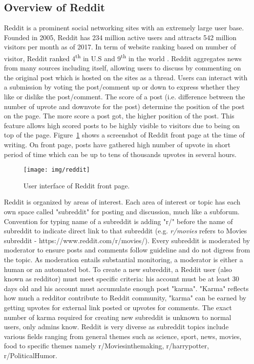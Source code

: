 \subsection{Overview of Reddit}
Reddit is a prominent social networking sites with an extremely large user base. Founded in 2005, Reddit has 234 million active users and attracts 542 million visitors per month as of 2017. In term of website ranking based on number of visitor, Reddit ranked 4\textsuperscript{th} in U.S and 9\textsuperscript{th} in the world \cite{Alexa2017}. Reddit aggregates news from many sources including itself, allowing users to discuss by commenting on the original post which is hosted on the sites as a thread. Users can interact with a submission by voting the post/comment up or down to express whether they like or dislike the post/comment. The score of a post (i.e. difference between the number of upvote and downvote for the post) determine the position of the post on the page. The more score a post got, the higher position of the post. This feature allows high scored posts to be highly visible to visitors due to being on top of the page. Figure~\ref{fig:reddit} shows a screenshot of Reddit front page at the time of writing. On front page, posts have gathered high number of upvote in short period of time which can be up to tens of thousands upvotes in several hours.
\begin{figure}[h!]
\centering
\texttt{[image: img/reddit]}
\caption{User interface of Reddit front page.} 
\label{fig:reddit}
\end{figure} 
Reddit is organized by areas of interest. Each area of interest or topic has each own space called "subreddit" for posting and discussion, much like a subforum. Convention for typing name of a subreddit is adding "r/" before the name of subreddit to indicate direct link to that subreddit (e.g. \textit{r/movies} refers to Movies subreddit - https://www.reddit.com/r/movies/). Every subreddit is moderated by moderator to ensure posts and comments follow guideline and do not digress from the topic. As moderation entails substantial monitoring, a moderator is either a human or an automated bot. To create a new subreddit, a Reddit user (also known as redditor) must meet specific criteria: his account must be at least 30 days old and his account must accumulate enough post "karma". "Karma" reflects how much a redditor contribute to Reddit community, "karma" can be earned by getting upvotes for external link posted or upvotes for comments. The exact number of karma required for creating new subreddit is unknown to normal users, only admins know. Reddit is very diverse as subreddit topics include various fields ranging from general themes such as science, sport, news, movies, food to specific themes namely r/Moviesinthemaking, r/harrypotter, r/PoliticalHumor.\\
